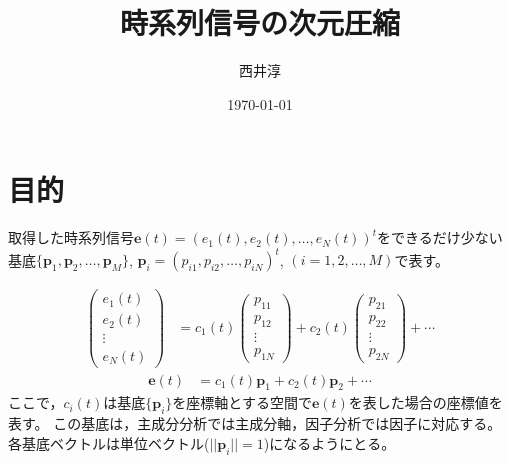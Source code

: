 \documentclass[a4paper,11pt]{jsarticle}
\begin{document}
\title{時系列信号の次元圧縮}
\author{西井淳}
\date{\today}
\maketitle

\section{目的}
取得した時系列信号$\bm{e}(t)=(e_1(t),e_2(t),\ldots,e_N(t))^t$をできるだけ少ない基底$\{\bm{p}_1,\bm{p}_2,\ldots,\bm{p}_M\}$, $\bm{p}_i=(p_{i1},p_{i2},\ldots, p_{iN})^t$, $(i=1,2,\ldots,M)$で表す。

\begin{align}
\begin{pmatrix}
  e_1(t) \\
  e_2(t) \\
  \vdots\\
  e_N(t)
\end{pmatrix}
&=
c_1(t)
\begin{pmatrix}
p_{11}\\
p_{12}\\
\vdots\\
p_{1N}
\end{pmatrix}
+
c_2(t)
\begin{pmatrix}
p_{21}\\
p_{22}\\
\vdots\\
p_{2N}
\end{pmatrix}
+ \cdots
\end{align}
\begin{align}
  \bm{e}(t)&=c_1(t)\bm{p}_1+c_2(t)\bm{p}_2+\cdots
\end{align}
ここで，$c_i(t)$は基底$\{\bm{p}_i\}$を座標軸とする空間で$\bm{e}(t)$を表した場合の座標値を表す。
この基底は，主成分分析では主成分軸，因子分析では因子に対応する。各基底ベクトルは単位ベクトル($||\bm{p}_i||=1$)になるようにとる。
\end{document}
